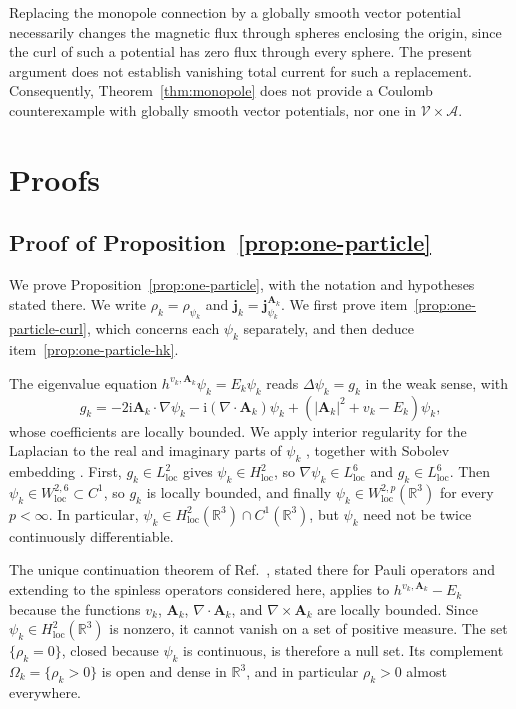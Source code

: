 \documentclass[11pt,a4paper]{article}
\theoremstyle{remark}
\theoremstyle{plain}
\newcommand{\R}{\mathbb R}
\newcommand{\jj}{\mathbf j}
\newcommand{\A}{\mathbf A}
\begin{document}
Replacing the monopole connection by a globally smooth vector potential
necessarily changes the magnetic flux through spheres enclosing the
origin, since the curl of such a potential has zero flux through every
sphere. The present argument does not establish vanishing total current
for such a replacement. Consequently,
Theorem~\ref{thm:monopole} does not provide a Coulomb counterexample
with globally smooth vector potentials, nor one in
$\mathcal V\times\mathcal A$.

\section{Proofs}
\label{sec:proofs}

\subsection{Proof of Proposition~\ref{prop:one-particle}}
\label{app:one-particle}

We prove Proposition~\ref{prop:one-particle}, with the notation and
hypotheses stated there. We write $\rho_k=\rho_{\psi_k}$ and
$\jj_k=\jj_{\psi_k}^{\A_k}$. We first prove
item~\ref{prop:one-particle-curl}, which concerns each $\psi_k$
separately, and then deduce item~\ref{prop:one-particle-hk}.

The eigenvalue equation 
$h^{v_k,\A_k}\psi_k=E_k\psi_k$ reads 
$\Delta\psi_k=g_k$ in the weak sense,
with
\begin{equation*}
 g_k=-2\mathrm{i}\A_k\cdot\nabla\psi_k-\mathrm{i}(\nabla\cdot\A_k)\psi_k
+(|\A_k|^2+v_k-E_k)\psi_k,
\end{equation*}
whose coefficients are locally bounded. We
apply interior regularity for the Laplacian to the real and imaginary
parts of $\psi_k$ \cite[Theorem~8.8 and Lemma~9.16]{GT2001}, together
with Sobolev embedding \cite[Chap.~7]{GT2001}. First,
$g_k\in L^2_{\mathrm{loc}}$ gives $\psi_k\in H^2_{\mathrm{loc}}$, so
$\nabla\psi_k\in L^6_{\mathrm{loc}}$ and $g_k\in L^6_{\mathrm{loc}}$.
Then $\psi_k\in W^{2,6}_{\mathrm{loc}}\subset C^1$, so $g_k$ is locally
bounded, and finally $\psi_k\in W^{2,p}_{\mathrm{loc}}(\R^3)$ for every
$p<\infty$. In particular,
$\psi_k\in H^2_{\mathrm{loc}}(\R^3)\cap C^1(\R^3)$, but $\psi_k$ need
not be twice continuously differentiable.

The unique continuation theorem of Ref.~\cite{Garrigue2020}, stated
there for Pauli operators and extending to the spinless operators
considered here, applies to $h^{v_k,\A_k}-E_k$ because the functions $v_k$,
$\A_k$, $\nabla\cdot\A_k$, and $\nabla\times\A_k$ are locally bounded.
Since $\psi_k\in H^2_{\mathrm{loc}}(\R^3)$ is nonzero, it cannot vanish
on a set of positive measure. The set $\{\rho_k=0\}$, closed
because $\psi_k$ is continuous, is therefore a null set. Its complement
$\Omega_k=\{\rho_k>0\}$ is open and dense in $\R^3$, and in particular
$\rho_k>0$ almost everywhere.
\end{document}
